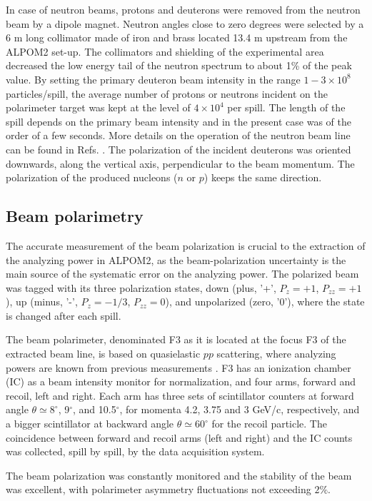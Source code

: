 \documentclass[epj]{svjour}
\begin{document}
In case of neutron beams, protons and deuterons were removed from the neutron beam by a dipole  magnet.  Neutron angles close to zero degrees were selected by a 6 m long collimator made of iron and brass located 13.4 m upstream from the ALPOM2 set-up. The collimators and shielding of the experimental area decreased the low energy tail of the neutron spectrum to about 1\% of 
the peak value.  By setting the primary deuteron beam intensity in the range $ {1-3\times 10^8}$ particles/spill, the average number of protons or neutrons incident on the polarimeter target was kept at the level of $4\times 10^4$ per spill. The length of the spill depends on the primary beam intensity and in the present case was of the order of a few seconds. More details on the operation of the neutron beam line can be found  in Refs. \cite{Kirillov:1996zf,Rukoyatkin:2001nd}.
The polarization of the incident deuterons was oriented downwards, along the vertical axis, perpendicular  to the beam momentum. The polarization of the produced nucleons ($n$ or $p$) keeps the same direction.
\subsection{Beam polarimetry}
The accurate measurement of the beam polarization is crucial to the extraction of the analyzing power in ALPOM2, as the beam-polarization uncertainty is the main source of the systematic error on the analyzing power. The polarized beam was tagged with its three polarization states, down (plus, '+', $P_z=+1$, $P_{zz}=+1$), up (minus, '-', $P_z=-1/3$, $P_{zz}=0$), and unpolarized (zero, '0'), where the state is changed after each spill. 

The beam polarimeter, denominated F3 as it is located at the focus F3 of the extracted beam line, is based on quasielastic $pp$   scattering, where analyzing powers are known from previous measurements \cite{Bystricky:1981}. F3 has an ionization chamber (IC) as a beam intensity monitor for normalization, and four arms, forward and recoil, left and right. Each arm has three sets of scintillator counters at forward angle $\theta \simeq 8^\circ$,  9$^\circ$,  and 10.5$^\circ$, for momenta 4.2, 3.75 and 3 GeV/c, respectively,  and a bigger scintillator at backward angle $\theta \simeq 60^\circ$ for the recoil particle. The coincidence between forward and recoil arms (left and right) and the IC counts was collected, spill by spill, by the data acquisition system.

The beam polarization was constantly monitored and the stability of the beam was excellent, with polarimeter asymmetry fluctuations not exceeding $2\%$. 
\end{document}
